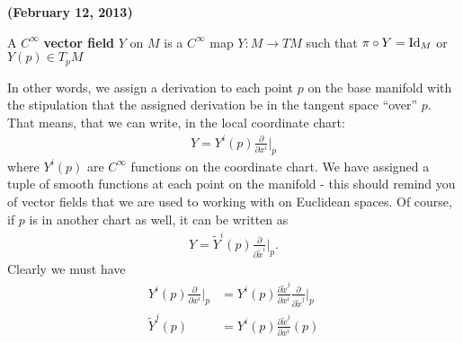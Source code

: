 \documentclass{../mathnotes}
\begin{document}
\newpage

\textbf{(February 12, 2013)}

\begin{defn}
    A $C^\infty$ \textbf{vector field} $Y$ on $M$ is a $C^\infty$ map $Y:M\to TM$ such that $\pi\circ Y=\operatorname{Id}_M$ or $Y(p)\in T_pM$
\end{defn}

In other words, we assign a derivation to each point $p$ on the base manifold with the stipulation that the assigned derivation be in the
tangent space ``over'' $p$. That means, that we can write, in the local coordinate chart:
\begin{align*}
    Y=Y^i(p)\frac{\partial}{\partial x^i}\bigg|_p
\end{align*}
where $Y^i(p)$ are $C^\infty$ functions on the coordinate chart. We have assigned a tuple of smooth functions at each point on the manifold - this
should remind you of vector fields that we are used to working with on Euclidean spaces. Of course, if $p$ is in another chart as well, it can be
written as 
\begin{align*}
    Y=\tilde{Y}^i(p)\frac{\partial}{\partial \tilde{x}^i}\bigg|_p.
\end{align*}
Clearly we must have
\begin{align*}
    Y^i(p)\frac{\partial}{\partial x^i}\bigg|_p&=Y^i(p)\frac{\partial \tilde{x}^j}{\partial x^i}\frac{\partial}{\partial \tilde{x}^j}\bigg|_p\\
    \tilde{Y}^j(p)&=Y^i(p)\frac{\partial \tilde{x}^j}{\partial x^i}(p)
\end{align*}
\end{document}
